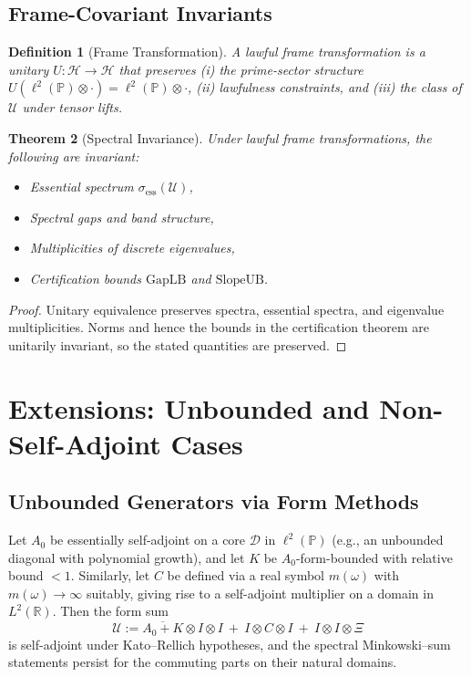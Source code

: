 \documentclass[10pt]{article}
\newtheorem{theorem}{Theorem}
\newtheorem{definition}[theorem]{Definition}
\newcommand{\PP}{\mathbb{P}}
\newcommand{\RR}{\mathbb{R}}
\begin{document}
\subsection{Frame-Covariant Invariants}

\begin{definition}[Frame Transformation]
A \emph{lawful frame transformation} is a unitary $U:\mathcal H\to\mathcal H$ that preserves (i) the prime-sector structure $U(\ell^2(\PP)\otimes\cdot)=\ell^2(\PP)\otimes\cdot$, (ii) lawfulness constraints, and (iii) the class of $\mathcal U$ under tensor lifts.
\end{definition}

\begin{theorem}[Spectral Invariance]
Under lawful frame transformations, the following are invariant:
\begin{itemize}
    \item Essential spectrum $\sigma_{\mathrm{ess}}(\mathcal U)$,
    \item Spectral gaps and band structure,
    \item Multiplicities of discrete eigenvalues,
    \item Certification bounds $\mathrm{GapLB}$ and $\mathrm{SlopeUB}$.
\end{itemize}
\end{theorem}

\begin{proof}
Unitary equivalence preserves spectra, essential spectra, and eigenvalue multiplicities. Norms and hence the bounds in the certification theorem are unitarily invariant, so the stated quantities are preserved.
\end{proof}

\section{Extensions: Unbounded and Non-Self-Adjoint Cases}\label{sec:extensions}

\subsection{Unbounded Generators via Form Methods}
Let $A_0$ be essentially self-adjoint on a core $\mathcal D$ in $\ell^2(\PP)$ (e.g., 
an unbounded diagonal with polynomial growth), and let $K$ be $A_0$-form-bounded with relative bound $<1$.
Similarly, let $C$ be defined via a real symbol $m(\omega)$ with $m(\omega)\to\infty$ suitably, giving rise to a self-adjoint multiplier on a domain in $L^2(\RR)$.
Then the form sum
\[
\mathcal U := \overline{A_0+K}\otimes I\otimes I\ +\ I\otimes C\otimes I\ +\ I\otimes I\otimes \Xi
\]
is self-adjoint under Kato–Rellich hypotheses, and the spectral Minkowski–sum statements persist for the commuting parts on their natural domains.
\end{document}
